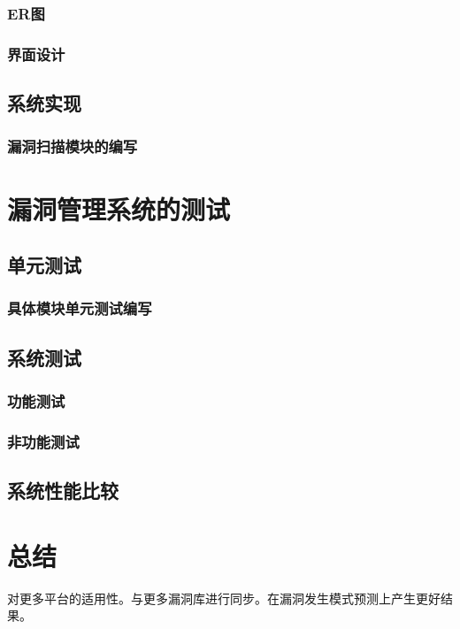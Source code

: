 \documentclass[a4paper]{ctexrep}
\begin{document}
			\subsection{ER图}
			\subsection{界面设计}

		\section{系统实现}
			\subsection{漏洞扫描模块的编写}
	\chapter{漏洞管理系统的测试}
		\section{单元测试}
			\subsection{具体模块单元测试编写}
		\section{系统测试}
			\subsection{功能测试}
			\subsection{非功能测试}
		\section{系统性能比较}
	\chapter{总结}
	对更多平台的适用性。与更多漏洞库进行同步。在漏洞发生模式预测上产生更好结果。
	
\end{document}
